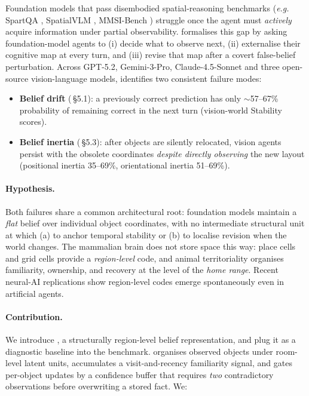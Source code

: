 Foundation models that pass disembodied spatial-reasoning benchmarks
(\textit{e.g.\ } SpartQA \citep{mirzaee2021spartqa}, SpatialVLM
\citep{chen2024spatialvlm}, MMSI-Bench \citep{yang2025mmsi}) struggle
once the agent must \emph{actively} acquire information under partial
observability. \tos \citep{zhang2026theoryofspace} formalises this gap by
asking foundation-model agents to (i) decide what to observe next,
(ii) externalise their cognitive map at every turn, and (iii) revise
that map after a covert false-belief perturbation. Across GPT-5.2,
Gemini-3-Pro, Claude-4.5-Sonnet and three open-source vision-language
models, \tos identifies two consistent failure modes:

\begin{itemize}
\item \textbf{Belief drift} (\tos\,\S5.1): a previously correct
prediction has only $\sim$57--67\% probability of remaining correct in
the next turn (vision-world Stability scores).

\item \textbf{Belief inertia} (\tos\,\S5.3): after objects are silently
relocated, vision agents persist with the obsolete coordinates
\emph{despite directly observing} the new layout (positional inertia
35--69\%, orientational inertia 51--69\%).
\end{itemize}

\paragraph{Hypothesis.}
Both failures share a common architectural root: foundation models
maintain a \emph{flat} belief over individual object coordinates, with
no intermediate structural unit at which (a) to anchor temporal
stability or (b) to localise revision when the world changes. The
mammalian brain does not store space this way: place cells
\citep{okeefe1971} and grid cells \citep{hafting2005} provide a
\emph{region-level} code, and animal territoriality
\citep{burt1943,powell2012homerange} organises familiarity, ownership,
and recovery at the level of the \emph{home range}. Recent neural-AI
replications \citep{banino2018grid} show region-level codes emerge
spontaneously even in artificial agents.

\paragraph{Contribution.}
We introduce \tb, a structurally region-level belief representation,
and plug it as a diagnostic baseline into the \tos benchmark. \tb
organises observed objects under room-level latent units, accumulates a
visit-and-recency familiarity signal, and gates per-object updates by a
confidence buffer that requires \emph{two} contradictory observations
before overwriting a stored fact. We:

